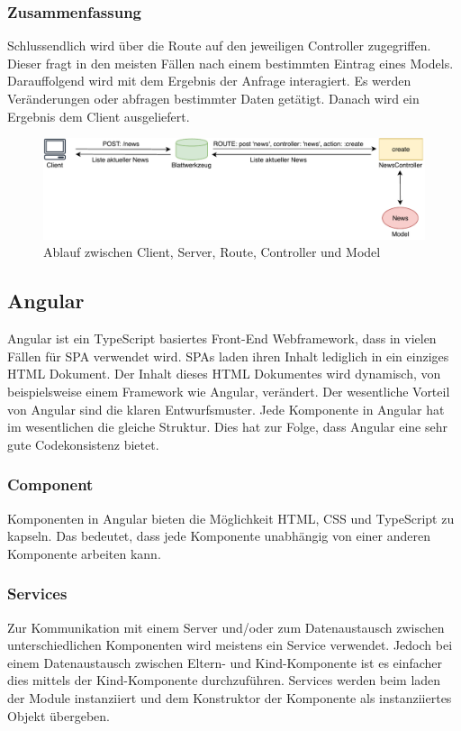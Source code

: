 \subsubsection{Zusammenfassung}
\label{sec: rails_resuemee}
Schlussendlich wird über die Route auf den jeweiligen Controller zugegriffen. Dieser fragt in den meisten Fällen nach einem bestimmten Eintrag eines Models. Darauffolgend wird mit dem Ergebnis der Anfrage interagiert. Es werden Veränderungen oder abfragen bestimmter Daten getätigt. Danach wird ein Ergebnis dem Client ausgeliefert.

\begin{figure}[h]
	\includegraphics[width=\textwidth]{graphics/rails-mvc.pdf}
	\caption{Ablauf zwischen Client, Server, Route, Controller und Model}
	\label{fig:rails-mvc}
\end{figure}

\subsection{Angular}
\label{sec: angular}
Angular ist ein TypeScript basiertes Front-End Webframework, dass in vielen Fällen für \gls{SPA} verwendet wird. \gls{SPA}s laden ihren Inhalt lediglich in ein einziges \gls{HTML} Dokument. Der Inhalt dieses \gls{HTML} Dokumentes wird dynamisch, von beispielsweise einem Framework wie Angular, verändert. Der wesentliche Vorteil von Angular sind die klaren Entwurfsmuster. Jede Komponente in Angular hat im wesentlichen die gleiche Struktur. Dies hat zur Folge, dass Angular eine sehr gute Codekonsistenz bietet.


\subsubsection{Component}
\label{sec: ang-component}
Komponenten in Angular bieten die Möglichkeit \gls{HTML}, \gls{CSS} und TypeScript zu kapseln. Das bedeutet, dass jede Komponente unabhängig von einer anderen Komponente arbeiten kann.

\subsubsection{Services}
\label{sec: ang-service}
Zur Kommunikation mit einem Server und/oder zum Datenaustausch zwischen unterschiedlichen Komponenten wird meistens ein Service verwendet. Jedoch bei einem Datenaustausch zwischen Eltern- und Kind-Komponente ist es einfacher dies mittels der Kind-Komponente durchzuführen. Services werden beim laden der Module instanziiert und dem Konstruktor der Komponente als instanziiertes Objekt übergeben.

